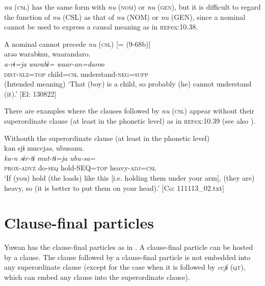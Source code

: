   \textit{nu} (\textsc{csl}) has the same form with \textit{nu} (\textsc{nom}) or \textit{nu} (\textsc{gen}), but it is difficult to regard the function of \textit{nu} (CSL) as that of \textit{nu} (NOM) or \textit{nu} (GEN), since a nominal cannot be used to express a causal meaning as in \textsc{ref}{ex:10.38}.

\ea\label{ex:10.38}   A nominal cannot precede \textit{nu} (\textsc{csl}) [= (9-68b)]\\
      \glll    *arəə  warabɨnu,  waarandaro.\\
     \textit{a-rɨ=ja}  \textit{warabɨ=}  \textit{waar-an=daroo}\\
     \textsc{dist}-\textsc{nlz}=\textsc{top}  child=\textsc{csl}  understand-\textsc{neg}=\textsc{supp}\\
    \glt     (Intended meaning) ‘That (boy) is a child, so probably (he) cannot understand (it).’ [El: 130822]
\z

  There are examples where the clauses followed by \textit{nu} (\textsc{csl}) appear without their superordinate clause (at least in the phonetic level) as in \textsc{ref}{ex:10.39} (see also ).

\ea\label{ex:10.39}   Withouth the superordinate clause (at least in the phonetic level)\\%
      \glll    kan  sjɨ  muccjəə,  ubusanu.\\
    \textit{ka-n}  \textit{sɨr-tɨ}  \textit{mut-tɨ=ja}  \textit{ubu-sa=}\\
    \textsc{prox}-\textsc{advz}  do-\textsc{seq}  hold-SEQ=\textsc{top}  heavy-\textsc{adj}=\textsc{csl}\\
\glt     ‘If (you) hold (the loads) like this [i.e. holding them under your arm], (they are) heavy, so (it is better to put them on your head).’  [Co: 111113\_02.txt]
\z

\section{Clause-final particles}\label{sec:10.3}

Yuwan has the clause-final particles as in . A clause-final particle can be hosted by a clause. The clause followed by a clause-final particle is not embedded into any superordinate clause (except for the case when it is followed by \textit{ccjɨ} (\textsc{qt}), which can embed any clause into the superordinate clause).

